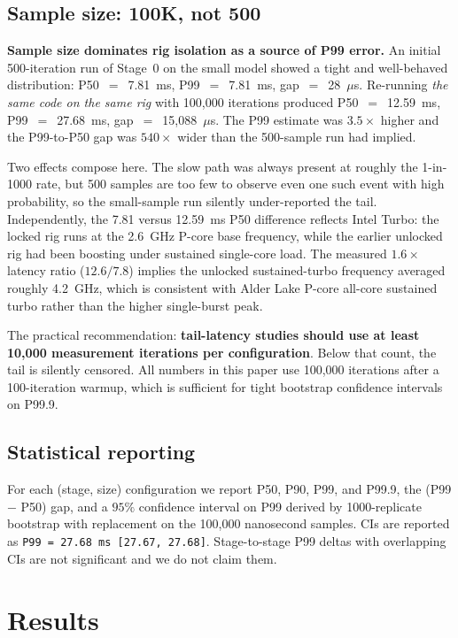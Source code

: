 \documentclass{article}
\begin{document}
\subsection{Sample size: 100K, not 500}
\label{sec:samplesize}

\textbf{Sample size dominates rig isolation as a source of P99 error.}
An initial 500-iteration run of Stage~0 on the small model showed a tight and well-behaved distribution: P50~$=$~7.81~ms, P99~$=$~7.81~ms, gap~$=$~28~$\mu$s.
Re-running \emph{the same code on the same rig} with 100{,}000 iterations produced P50~$=$~12.59~ms, P99~$=$~27.68~ms, gap~$=$~15{,}088~$\mu$s.
The P99 estimate was $3.5\times$ higher and the P99-to-P50 gap was $540\times$ wider than the 500-sample run had implied.

Two effects compose here.
The slow path was always present at roughly the 1-in-1000 rate, but 500 samples are too few to observe even one such event with high probability, so the small-sample run silently under-reported the tail.
Independently, the 7.81 versus 12.59~ms P50 difference reflects Intel Turbo: the locked rig runs at the 2.6~GHz P-core base frequency, while the earlier unlocked rig had been boosting under sustained single-core load.
The measured $1.6\times$ latency ratio ($12.6/7.8$) implies the unlocked sustained-turbo frequency averaged roughly 4.2~GHz, which is consistent with Alder Lake P-core all-core sustained turbo rather than the higher single-burst peak.

The practical recommendation: \textbf{tail-latency studies should use at least 10{,}000 measurement iterations per configuration}.
Below that count, the tail is silently censored.
All numbers in this paper use 100{,}000 iterations after a 100-iteration warmup, which is sufficient for tight bootstrap confidence intervals on P99.9.

\subsection{Statistical reporting}
\label{sec:method:stats}

For each (stage, size) configuration we report P50, P90, P99, and P99.9, the (P99 $-$ P50) gap, and a $95\%$ confidence interval on P99 derived by 1000-replicate bootstrap with replacement on the 100{,}000 nanosecond samples.
CIs are reported as \texttt{P99 = 27.68 ms [27.67, 27.68]}.
Stage-to-stage P99 deltas with overlapping CIs are not significant and we do not claim them.

\section{Results}
\label{sec:results}
\end{document}
